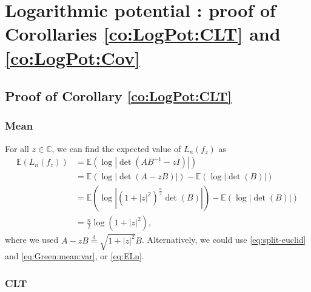 \documentclass[10pt,reqno]{amsart}
\numberwithin{equation}{section}
\numberwithin{figure}{section}
\theoremstyle{plain}
\newcommand{\<}{\langle}
\renewcommand{\>}{\rangle}
\begin{document}
%
%
%
%
%
%
%

%

%
%
%
%
%
%
%
%
%
%
%
%
%
%
%
%
%
%
%
%
%
%
%
%
%

%
%
%
%
%
%
%
%
%
%
%
%
%
%
%
%
%
%
%
%
%
%
%
%
%
%
%
%
%
%
%
%
%
%
%
%
%
%
%
%
%
%
%
%
%
%
%
%
%
%
%
%
%
%
%
%
%
%
%
%
%
%
%
%
%
%
%
%
%
%
%
%
%
%
%
%
%
%
%
%
%
%
%
%
%
%
%
%
%
%
%
%
%
%
%
%
%
%
%
%
%
%
%
%
%
%
%
%
%
%
%

%
%
%
%
%
%
%
%
%
%
%
%
%
%
%
%
%

%
%
%
%

\section{Logarithmic potential : proof of Corollaries \ref{co:LogPot:CLT} and \ref{co:LogPot:Cov}}
\label{se:proof:LogPot}

\subsection{Proof of Corollary \ref{co:LogPot:CLT}}
\label{se:proof:co:LogPot:CLT}

\subsubsection{Mean}

For all $z\in\mathbb{C}$, we can find the
expected value of $L_n(f_z)$ as
\begin{align}
  \mathbb{E}(L_n(f_z))
  &=\mathbb{E}(\log|\det(AB^{-1}-zI)|)\\
  &=\mathbb{E}(\log|\det(A-zB)|)-\mathbb{E}(\log|\det(B)|)\\
  &=\mathbb{E}(\log|(1+|z|^2)^{\frac{n}{2}}\det(B)|)-\mathbb{E}(\log|\det(B)|)\\
  &=\frac{n}{2}\log(1+|z|^2), \label{eq:LogPot:mean}
\end{align}
where we used $A-zB\overset{\mathrm{d}}{=}\sqrt{1+|z|^2}B$. Alternatively, we could use
\eqref{eq:split-euclid} and \eqref{eq:Green:mean:var}, or \eqref{eq:ELn}.

\subsubsection{CLT}
\end{document}
